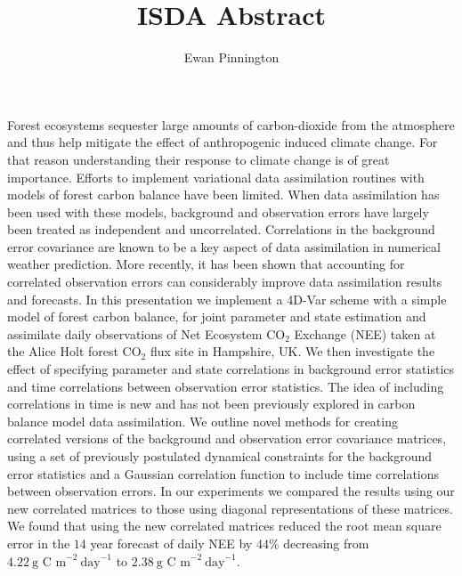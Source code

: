 \documentclass[11pt]{article}
\title{ISDA Abstract}
\author{Ewan Pinnington}
\begin{document}
\maketitle

Forest ecosystems sequester large amounts of carbon-dioxide from the atmosphere and thus help mitigate the effect of anthropogenic induced climate change. For that reason understanding their response to climate change is of great importance. Efforts to implement variational data assimilation routines with models of forest carbon balance have been limited. When data assimilation has been used with these models, background and observation errors have largely been treated as independent and uncorrelated. Correlations in the background error covariance are known to be a key aspect of data assimilation in numerical weather prediction. More recently, it has been shown that accounting for correlated observation errors can considerably improve data assimilation results and forecasts. In this presentation we implement a 4D-Var scheme with a simple model of forest carbon balance, for joint parameter and state estimation and assimilate daily observations of Net Ecosystem $\text{CO}_{2}$ Exchange (NEE) taken at the Alice Holt forest $\text{CO}_2$ flux site in Hampshire, UK. We then investigate the effect of specifying parameter and state correlations in background error statistics and time correlations between observation error statistics. The idea of including correlations in time is new and has not been previously explored in carbon balance model data assimilation. We outline novel methods for creating correlated versions of the background and observation error covariance matrices, using a set of previously postulated dynamical constraints for the background error statistics and a Gaussian correlation function to include time correlations between observation errors. In our experiments we compared the results using our new correlated matrices to those using diagonal representations of these matrices. We found that using the new correlated matrices reduced the root mean square error in the $14$ year forecast of daily NEE by $44\%$ decreasing from $4.22~\text{g~C~m}^{-2}~\text{day}^{-1}$ to $2.38~\text{g~C~m}^{-2}~\text{day}^{-1}$.     
\end{document}
